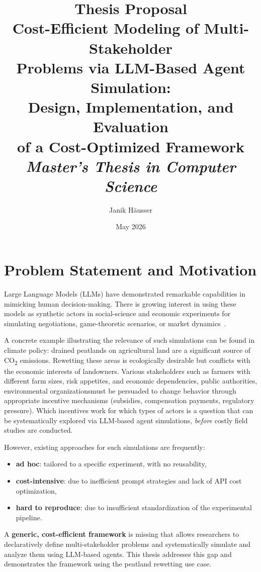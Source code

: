 \documentclass[12pt, a4paper]{article}
\title{%
    \vspace{-1cm}
    \textbf{Thesis Proposal}\\[0.8em]
    \Large Cost-Efficient Modeling of Multi-Stakeholder\\
    Problems via LLM-Based Agent Simulation:\\[0.3em]
    Design, Implementation, and Evaluation\\
    of a Cost-Optimized Framework\\[1em]
    \normalsize\textit{Master's Thesis in Computer Science}
}
\author{Janik H\"ausser}
\date{May 2026}
\begin{document}
\maketitle
\thispagestyle{empty}

\newpage

\setcounter{page}{1}
\tableofcontents
\newpage

\section{Problem Statement and Motivation}

Large Language Models (LLMs) have demonstrated remarkable capabilities in mimicking human decision-making. There is growing interest in using these models as synthetic actors in social-science and economic experiments for simulating negotiations, game-theoretic scenarios, or market dynamics~\cite{horton2023}.

A concrete example illustrating the relevance of such simulations can be found in climate policy: drained peatlands on agricultural land are a significant source of CO\textsubscript{2} emissions. Rewetting these areas is ecologically desirable but conflicts with the economic interests of landowners. Various stakeholders such as farmers with different farm sizes, risk appetites, and economic dependencies, public authorities, environmental organizationsmust be persuaded to change behavior through appropriate incentive mechanisms (subsidies, compensation payments, regulatory pressure). Which incentives work for which types of actors is a question that can be systematically explored via LLM-based agent simulations, \textit{before} costly field studies are conducted.

However, existing approaches for such simulations are frequently:
\begin{itemize}
    \item \textbf{ad hoc}: tailored to a specific experiment, with no reusability,
    \item \textbf{cost-intensive}: due to inefficient prompt strategies and lack of API cost optimization,
    \item \textbf{hard to reproduce}: due to insufficient standardization of the experimental pipeline.
\end{itemize}

A \textbf{generic, cost-efficient framework} is missing that allows researchers to declaratively define multi-stakeholder problems and systematically simulate and analyze them using LLM-based agents. This thesis addresses this gap and demonstrates the framework using the peatland rewetting use case.
\end{document}
